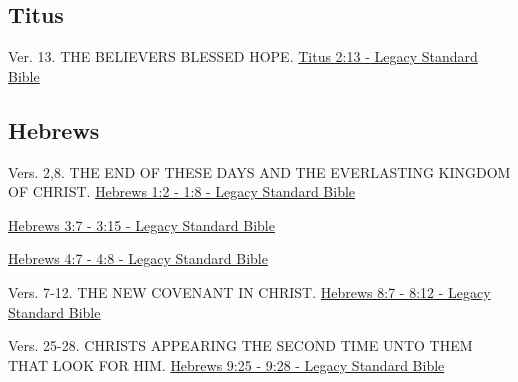 \documentclass[
  ignorenonframetext,
]{beamer}
\begin{document}
\subsection{Titus}\label{titus}

\begin{frame}{2}
\label{section-233}
\begin{block}{Ver. 13. THE BELIEVER\textquotesingle S BLESSED HOPE.}
\label{ver.-13.-the-believers-blessed-hope.}
\href{https://read.lsbible.org/?q=titus2\%3A13}{Titus 2:13 - Legacy
Standard Bible}
\end{block}
\end{frame}

\subsection{Hebrews}\label{hebrews}

\begin{frame}{1}
\label{section-234}
\begin{block}{Vers. 2,8. THE END OF THESE DAYS AND THE EVERLASTING
KINGDOM OF CHRIST.}
\label{vers.-28.-the-end-of-these-days-and-the-everlasting-kingdom-of-christ.}
\href{https://read.lsbible.org/?q=heb1\%3A2-8}{Hebrews 1:2 - 1:8 -
Legacy Standard Bible}
\end{block}
\end{frame}

\begin{frame}{3}
\label{section-235}
\href{https://read.lsbible.org/?q=heb3\%3A7-15}{Hebrews 3:7 - 3:15 -
Legacy Standard Bible}
\end{frame}

\begin{frame}{4}
\label{section-236}
\href{https://read.lsbible.org/?q=heb4\%3A7-8}{Hebrews 4:7 - 4:8 -
Legacy Standard Bible}
\end{frame}

\begin{frame}{8}
\label{section-237}
\begin{block}{Vers. 7-12. THE NEW COVENANT IN CHRIST.}
\label{vers.-7-12.-the-new-covenant-in-christ.}
\href{https://read.lsbible.org/?q=heb8\%3A7-12}{Hebrews 8:7 - 8:12 -
Legacy Standard Bible}
\end{block}
\end{frame}

\begin{frame}{9}
\label{section-238}
\begin{block}{Vers. 25-28. CHRIST\textquotesingle S APPEARING THE SECOND
TIME UNTO THEM THAT LOOK FOR HIM.}
\label{vers.-25-28.-christs-appearing-the-second-time-unto-them-that-look-for-him.}
\href{https://read.lsbible.org/?q=heb9\%3A25-28}{Hebrews 9:25 - 9:28 -
Legacy Standard Bible}
\end{block}
\end{frame}
\end{document}
